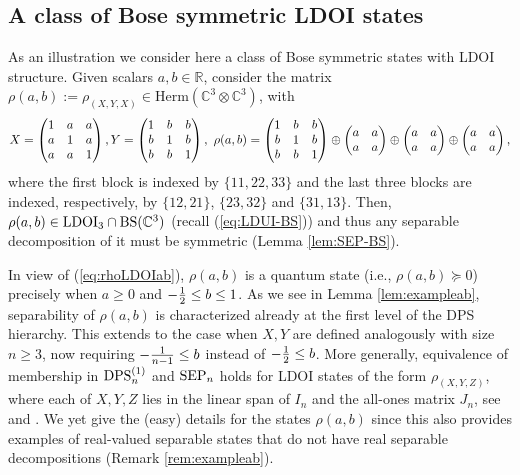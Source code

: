 \documentclass[11pt]{article}
\newcommand{\R}{\ensuremath{\mathbb{R}}}   %
\newcommand{\C}{\ensuremath{\mathbb{C}}} %
\newcommand{\Herm}{\mathrm{Herm}}
\newcommand{\SEP}{\text{\rm SEP}}
\newcommand{\LDOI}{\text{\rm LDOI}}
\newcommand{\DPS}{\text{\rm DPS}}
\newcommand{\ot}{\otimes}
\newcommand{\BS}{\text{\rm BS}}
\theoremstyle{plain}
\begin{document}
\subsection{A class of Bose symmetric LDOI states}\label{sec:exampleab}

As an illustration we consider here a class of Bose symmetric states with LDOI structure. Given 
 scalars $a,b\in \R$, consider the  matrix $\rho(a,b):=\rho_{(X,Y,X)}\in \Herm(\C^3\ot \C^3)$,   with 
\begin{align}\label{eq:rhoLDOIab}
X=\begin{pmatrix} 1 & a & a \cr a & 1 & a\cr a & a &1\end{pmatrix}, 
Y=\begin{pmatrix} 1 & b & b \cr b & 1 & b\cr b& b &1\end{pmatrix}, \
\rho(a,b)= \begin{pmatrix} 1 & b & b \cr b & 1 & b\cr b& b &1\end{pmatrix}
\oplus \begin{pmatrix} a & a \cr a & a\end{pmatrix}
\oplus \begin{pmatrix} a & a \cr a & a\end{pmatrix}
\oplus \begin{pmatrix} a & a \cr a & a\end{pmatrix},
\end{align}
where the first block is indexed by $\{11,22,33\}$ and the last three blocks are indexed, respectively, by $\{12,21\}$, $\{23,32\}$ and $\{31,13\}$. Then, $\rho(a,b)\in \LDOI_3\cap \BS(\C^3)$  (recall (\ref{eq:LDUI-BS})) and thus 
any separable decomposition of it must be symmetric (Lemma \ref{lem:SEP-BS}).

In view of   (\ref{eq:rhoLDOIab}), $\rho(a,b)$ is a quantum state (i.e., $\rho(a,b)\succeq 0$) precisely when $a\ge 0$ and  $-{1\over 2}\le b\le 1$. As we  see in Lemma \ref{lem:exampleab}, separability of $\rho(a,b)$ is characterized already at the first level of the DPS hierarchy.
This extends to the case when  $X,Y$ are  defined analogously with size  $n\ge 3$, now requiring $-{1\over n-1}\le b$ instead of $-{1\over 2}\le b$. 
More generally, equivalence of membership in $\DPS^{(1)}_n$ and $\SEP_n$ holds  for LDOI states of the form $\rho_{(X,Y,Z)}$, where each of $X,Y,Z$ lies in the linear span of $I_n$ and the all-ones matrix $J_n$, see \cite[Theorem 4.1]{PJPY_2024} and \cite[Theorem III.3]{GNS-cyclic_2025}. We yet give the (easy)  details for the states $\rho(a,b)$ since this also provides examples of real-valued separable states that do not have real separable decompositions (Remark \ref{rem:exampleab}).
\end{document}
